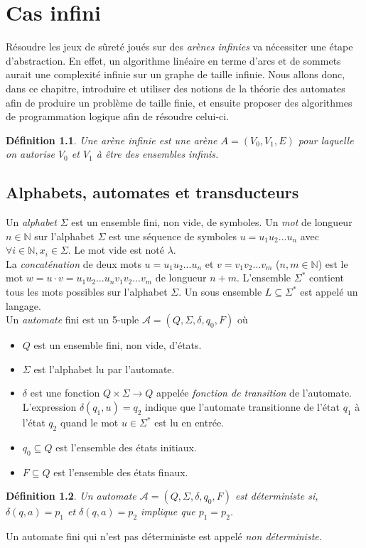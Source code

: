 \documentclass[12pt,a4paper,oneside,titlepage]{report}
\newtheorem{defi}{D\'efinition}[section]
\begin{document}
\chapter{Cas infini}
Résoudre les jeux de sûreté joués sur des \emph{arènes infinies} va nécessiter une étape d'abstraction. En effet, un algorithme linéaire en terme d'arcs et de sommets aurait une complexité infinie sur un graphe de taille infinie. Nous allons donc, dans ce chapitre, introduire et utiliser des notions de la théorie des automates afin de produire un problème de taille finie, et ensuite proposer des algorithmes de programmation logique afin de résoudre celui-ci.
\begin{defi}
Une \emph{arène infinie} est une arène $A=(V_0, V_1, E)$ pour laquelle on autorise $V_0$ et $V_1$ à être des ensembles infinis.
\end{defi}

\section{Alphabets, automates et transducteurs}
Un \emph{alphabet} $\Sigma$ est un ensemble fini, non vide, de symboles. Un \emph{mot} de longueur $n\in\mathbb{N}$ sur l'alphabet $\Sigma$ est une séquence de symboles $u=u_1u_2...u_n$ avec $\forall i\in\mathbb{N}, x_i\in \Sigma$. Le mot vide est noté $\lambda$.\\
La \emph{concaténation} de deux mots $u=u_1u_2...u_n$ et $v=v_1v_2...v_m$ ($n,m\in\mathbb{N}$) est le mot $w=u\cdot v=u_1u_2...u_nv_1v_2...v_m$ de longueur $n+m$. L'ensemble $\Sigma^*$ contient tous les mots possibles sur l'alphabet $\Sigma$. Un sous ensemble $L\subseteq \Sigma^*$ est appelé un langage.\\

\noindent Un \emph{automate} fini est un 5-uple $\mathcal{A}=(Q,\Sigma,\delta,q_0,F)$ où 
\begin{itemize}
	\item $Q$ est un ensemble fini, non vide, d'états.
	\item $\Sigma$ est l'alphabet lu par l'automate.
	\item $\delta$ est une fonction $Q\times\Sigma\to Q$ appelée \emph{fonction de transition} de l'automate. L'expression $\delta(q_1,u)=q_2$ indique que l'automate transitionne de l'état $q_1$ à l'état $q_2$ quand le mot $u\in\Sigma^*$ est lu en entrée.
	\item $q_0\subseteq Q$ est l'ensemble des états initiaux.
	\item $F\subseteq Q$ est l'ensemble des états finaux.
\end{itemize}
\begin{defi}
Un automate $\mathcal{A}=(Q,\Sigma,\delta,q_0,F)$ est \emph{déterministe} si, $\delta(q,a)=p_1$ et $\delta(q,a)=p_2$ implique que $p_1=p_2$.
\end{defi}
Un automate fini qui n'est pas déterministe est appelé \emph{non déterministe}.\\
\end{document}
